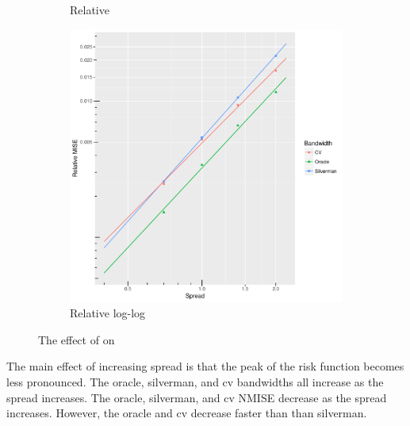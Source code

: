 \begin{figure}[htbp]
\begin{subfigure}[b]{0.3\textwidth}
        \caption{Relative }
        \label{fig:ise:unif_100_SD:rmise}
    \end{subfigure}
    \begin{subfigure}[b]{0.3\textwidth}
        \includegraphics[width=\textwidth]{results/by_cases_spread/RMISE-vs-risk-spread-log-log}
        \caption{Relative  log-log}
        \label{fig:ise:unif_100_SD:rmise_log_log}
    \end{subfigure}
    \caption[: by risk ]
        {The effect of  on }
    \label{fig:ise:unif_100_SD}
\end{figure}



The main effect of increasing spread is that the peak of the risk function becomes less pronounced.
The \gls{oracle}, \gls{silverman}, and \gls{cv} bandwidths all increase as the spread increases.
The \gls{oracle}, \gls{silverman}, and \gls{cv} NMISE decrease as the spread increases.
However, the \gls{oracle} and \gls{cv} decrease faster than than \gls{silverman}.



